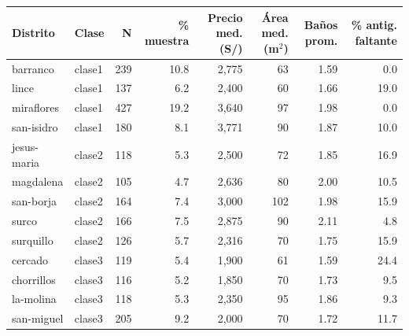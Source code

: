 \begin{tabular}{llrrrrrr}
\toprule
Distrito & Clase & N & \% muestra & Precio med. (S/) & Área med. (m$^2$) & Baños prom. & \% antig. faltante \\
\midrule
barranco & clase1 & 239 & 10.8 & 2,775 & 63 & 1.59 & 0.0 \\
lince & clase1 & 137 & 6.2 & 2,400 & 60 & 1.66 & 19.0 \\
miraflores & clase1 & 427 & 19.2 & 3,640 & 97 & 1.98 & 0.0 \\
san-isidro & clase1 & 180 & 8.1 & 3,771 & 90 & 1.87 & 10.0 \\
jesus-maria & clase2 & 118 & 5.3 & 2,500 & 72 & 1.85 & 16.9 \\
magdalena & clase2 & 105 & 4.7 & 2,636 & 80 & 2.00 & 10.5 \\
san-borja & clase2 & 164 & 7.4 & 3,000 & 102 & 1.98 & 15.9 \\
surco & clase2 & 166 & 7.5 & 2,875 & 90 & 2.11 & 4.8 \\
surquillo & clase2 & 126 & 5.7 & 2,316 & 70 & 1.75 & 15.9 \\
cercado & clase3 & 119 & 5.4 & 1,900 & 61 & 1.59 & 24.4 \\
chorrillos & clase3 & 116 & 5.2 & 1,850 & 70 & 1.73 & 9.5 \\
la-molina & clase3 & 118 & 5.3 & 2,350 & 95 & 1.86 & 9.3 \\
san-miguel & clase3 & 205 & 9.2 & 2,000 & 70 & 1.72 & 11.7 \\
\bottomrule
\end{tabular}